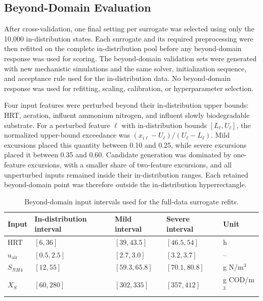 \documentclass[12pt, twoside]{book}
\begin{document}
\subsection{Beyond-Domain Evaluation}

After cross-validation, one final setting per surrogate was selected using only the 10,000 in-distribution
states. Each surrogate and its required preprocessing were then refitted on the complete in-distribution pool
before any beyond-domain response was used for scoring. The beyond-domain validation sets were generated with
new mechanistic simulations and the same solver, initialization sequence, and acceptance rule used for the
in-distribution data. No beyond-domain response was used for refitting, scaling, calibration, or hyperparameter
selection.

Four input features were perturbed beyond their in-distribution upper bounds: HRT, aeration, influent ammonium
nitrogen, and influent slowly biodegradable substrate. For a perturbed feature \(\ell\) with in-distribution
bounds \([L_\ell,U_\ell]\), the normalized upper-bound exceedance was
\((x_{i\ell}-U_\ell)/(U_\ell-L_\ell)\). Mild excursions placed this quantity between 0.10 and 0.25, while
severe excursions placed it between 0.35 and 0.60. Candidate generation was dominated by one-feature
excursions, with a smaller share of two-feature excursions, and all unperturbed inputs remained inside their
in-distribution ranges. Each retained beyond-domain point was therefore outside the in-distribution
hyperrectangle.

\begin{table}[htbp]
\centering
\caption{Beyond-domain input intervals used for the full-data surrogate refits.}
\label{tab:ch2_beyond_domain}
\scriptsize
\setlength{\tabcolsep}{5pt}
\begin{tabular}{p{2.5cm}p{3.2cm}p{3.2cm}p{3.2cm}p{1.5cm}}
\toprule
Input & In-distribution interval & Mild interval & Severe interval & Unit \\
\midrule
HRT & \([6,36]\) & \([39,43.5]\) & \([46.5,54]\) & h \\
\(u_{\mathrm{air}}\) & \([0.5,2.5]\) & \([2.7,3.0]\) & \([3.2,3.7]\) & -- \\
\(S_{NH4}\) & \([12,55]\) & \([59.3,65.8]\) & \([70.1,80.8]\) & g N/m\(^3\) \\
\(X_S\) & \([60,280]\) & \([302,335]\) & \([357,412]\) & g COD/m\(^3\) \\
\bottomrule
\end{tabular}
\end{table}
\end{document}
